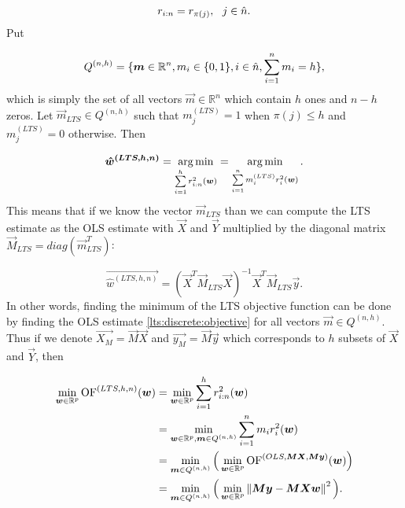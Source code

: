 \begin{equation}
    r_{i:n} = r_{\pi(j)}\\, \ \ j \in \hat{n}.
\end{equation}
Put

 \begin{equation}
   Q^{(n,h)} = \{{\vec{m} \in \mathbb{R}^n \\, m_i \in \{{0, 1\}} \\,i \in \hat{n} \\,   \sum\limits_{i=1}^n  m_i = h \}},
\end{equation}
which is simply the set of all vectors $\vec{m} \in \mathbb{R}^n$ which contain $h$ ones and $n-h$ zeros. Let $\vec{m}_{LTS} \in Q^{(n,h)}$  such that  $m^{(LTS)}_j = 1$ when $\pi(j) \leq h$ and $m^{(LTS)}_j = 0$ otherwise. Then

\begin{equation} \label{ltshat}
    \vec{\hat{w}^{(LTS, h, n)}} =  
  \argmin_{ \sum\limits_{i=1}^h r_{i:n}^2(\vec{w}) } = 
  \argmin_{ \sum\limits_{i=1}^n m^{(LTS)}_i r_{i}^2(\vec{w}) }. 
\end{equation}
This means that if we know the vector $\vec{m}_{LTS}$ than we can compute the LTS estimate as the OLS estimate with $\vec{X}$ and $\vec{Y}$ multiplied by the diagonal matrix $\vec{M}_{LTS} = diag(\vec{m}^T_{LTS})$:

\begin{equation}  \label{lts:discrete:objective}
    \vec{\hat{w}^{(LTS, h, n)}} = (\vec{X}^T\vec{M}_{LTS}\vec{X})^{-1}\vec{X}^T\vec{M}_{LTS}\vec{y}.
\end{equation}
In other words, finding the minimum of the LTS objective function can be done by finding the OLS estimate \eqref{lts:discrete:objective} for all vectors 
$\vec{m} \in Q^{(n,h)}$. 
Thus if we denote $\vec{X_{M}} = \vec{M}\vec{X} $ and $\vec{y_{M}} = \vec{M}\vec{y}$ which corresponds to $h$ subsets  of $\vec{X}$ and $\vec{Y}$, then \cite{kloudaVyzkumnyUkol}





\begin{align*} 
\minim_{\vec{w} \in \mathbb{R}^p} 
    \of^{(LTS, h, n)}(\vec{w})  
&=\minim_{\vec{w} \in \mathbb{R}^p} 
    \sum\limits_{i=1}^h r_{i:n}^2(\vec{w})  \\
&= \minim_{\vec{w} \in \mathbb{R}^p,\vec{m} \in Q^{(n,h)}} 
        \sum\limits_{i=1}^n m_i r_{i}^2(\vec{w})\\
&= \minim_{\vec{m} \in Q^{(n,h)}} 
            \Big( \minim_{\vec{w} \in\mathbb{R}^p} 
            \of^{(OLS,\vec{M}\vec{X},  \vec{M}\vec{y} )} (\vec{w}) \Big)\\
&= \minim_{\vec{m} \in Q^{(n,h)}} 
            \Big(\minim_{\vec{w} \in\mathbb{R}^p}  
            \norm{ \vec{M}\vec{y} -   \vec{M}\vec{X}\vec{w}  }^2 \Big).
\end{align*}

